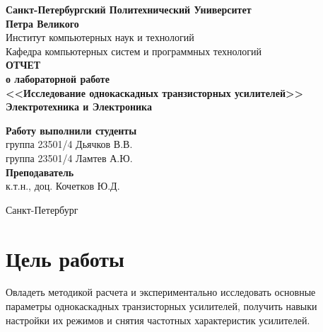 \documentclass[a4paper,14pt]{extarticle}
\newcommand{\sign}[1][5cm]{\makebox[#1]{\hrulefill}} %
\begin{document}
\begin{titlepage}
\begin{center}
	\textbf{Санкт-Петербургский Политехнический Университет \\Петра Великого}\\[0.3cm]
	\small Институт компьютерных наук и технологий \\[0.3cm]
	\small Кафедра компьютерных систем и программных технологий\\[4cm]
	
	\textbf{ОТЧЕТ}\\ \textbf{о лабораторной работе}\\[0.5cm]
	\textbf{<<Исследование однокаскадных транзисторных усилителей>>}\\[0.1cm]
	\textbf{Электротехника и Электроника}\\[10.5cm]
\end{center}

\begin{flushright}
	\begin{minipage}{0.60\textwidth}
		\begin{flushleft}
			\small \textbf{Работу выполнили студенты}\\[3mm]
			\small группа 23501/4 \hspace*{17mm} Дьячков В.В.\\[3mm]
			\small группа 23501/4 \hspace*{17mm} Ламтев А.Ю.\\[5mm]
			
			\small \textbf{Преподаватель}\\[5mm]
		 	\small \sign[3.5cm] \hspace*{8mm} к.т.н., доц. Кочетков Ю.Д.\\[0.5cm]
		\end{flushleft}
	\end{minipage}
\end{flushright}

\vfill

\begin{center}
	\small Санкт-Петербург\\
	\small \the\year
\end{center}
\end{titlepage}

\section{Цель работы}

Овладеть методикой расчета и экспериментально исследовать основные параметры однокаскадных транзисторных усилителей, получить навыки настройки их режимов и снятия частотных характеристик усилителей.
\end{document}
